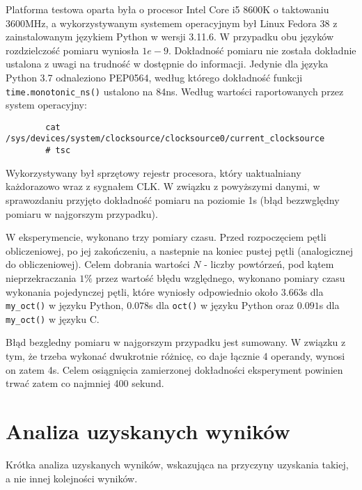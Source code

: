 \documentclass[11pt]{article}
\begin{document}
		Platforma testowa oparta była o procesor Intel Core i5 8600K o taktowaniu 3600MHz, 
		a wykorzystywanym systemem operacyjnym był Linux Fedora 38 z zainstalowanym językiem Python w wersji 3.11.6. 
		W przypadku obu języków rozdzielczość pomiaru wyniosła $1e-9$.
		Dokładność pomiaru nie została dokładnie ustalona z uwagi na trudność w dostępnie do informacji.
		Jedynie dla języka Python 3.7 odnaleziono PEP0564, według którego dokładność funkcji \lstinline{time.monotonic_ns()} ustalono na 84ns.
		Według wartości raportowanych przez system operacyjny:
		\begin{lstlisting}
		cat /sys/devices/system/clocksource/clocksource0/current_clocksource
		# tsc
		\end{lstlisting}
		Wykorzystywany był sprzętowy rejestr procesora, który uaktualniany każdorazowo wraz z sygnałem CLK.
		W związku z powyższymi danymi, w sprawozdaniu przyjęto dokładność pomiaru na poziomie 1s (błąd bezzwględny pomiaru w najgorszym przypadku).
		
		W eksperymencie, wykonano trzy pomiary czasu. Przed rozpoczęciem pętli obliczeniowej, po jej zakończeniu, a nastepnie na koniec pustej pętli (analogicznej do obliczeniowej).
		Celem dobrania wartości $N$ - liczby powtórzeń, pod kątem nieprzekraczania $1\%$ przez wartość błędu względnego, wykonano pomiary czasu wykonania pojedynczej pętli, 
		które wyniosły odpowiednio około $3.663$s dla \texttt{my\_oct()} w języku Python, $0.078$s dla \texttt{oct()} w języku Python oraz $0.091$s dla \texttt{my\_oct()} w języku C.

		Błąd bezgledny pomiaru w najgorszym przypadku jest sumowany. W związku z tym, że trzeba wykonać dwukrotnie różnicę, co daje łącznie 4 operandy, wynosi on zatem 4s.
		Celem osiągnięcia zamierzonej dokładności eksperyment powinien trwać zatem co najmniej 400 sekund.
		
	
	\section{Analiza uzyskanych wyników}
	Krótka analiza uzyskanych wyników, wskazująca na przyczyny uzyskania takiej, a nie innej kolejności wyników.
\end{document}
